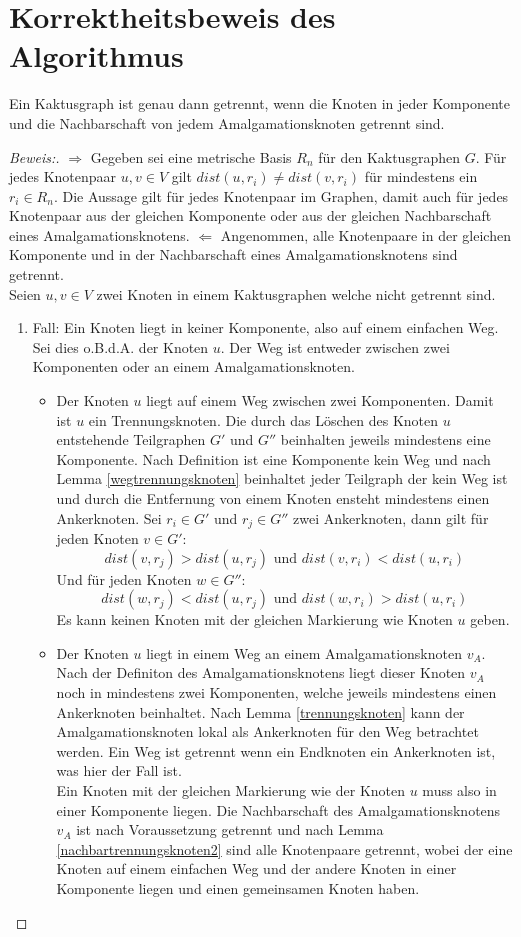 \section{Korrektheitsbeweis des Algorithmus}
\begin{lem}
Ein Kaktusgraph ist genau dann getrennt, wenn die Knoten in jeder Komponente und die Nachbarschaft von jedem Amalgamationsknoten getrennt sind.  
\end{lem}
\begin{proof}[Beweis:]
$\Longrightarrow$ Gegeben sei eine metrische Basis $R_n$ für den Kaktusgraphen $G$. Für jedes Knotenpaar $u,v \in V$ gilt $dist(u,r_i)\neq dist(v,r_i)$ für mindestens ein $r_i \in R_n$. Die Aussage gilt für jedes Knotenpaar im Graphen, damit auch für jedes Knotenpaar aus der gleichen Komponente oder aus der gleichen Nachbarschaft eines Amalgamationsknotens.\newline
$\Longleftarrow$ Angenommen, alle Knotenpaare in der gleichen Komponente und in der Nachbarschaft eines Amalgamationsknotens sind getrennt.\\
Seien $u,v \in V$ zwei Knoten in einem Kaktusgraphen welche nicht getrennt sind.
\begin{enumerate}
\item Fall: Ein Knoten liegt in keiner Komponente, also auf einem einfachen Weg. Sei dies o.B.d.A. der Knoten $u$. Der Weg ist entweder zwischen zwei Komponenten oder an einem Amalgamationsknoten.
\begin{itemize}
\item Der Knoten $u$ liegt auf einem Weg zwischen zwei Komponenten. Damit ist $u$ ein Trennungsknoten. Die durch das Löschen des Knoten $u$ entstehende Teilgraphen $G'$ und $G''$ beinhalten jeweils mindestens eine Komponente. Nach Definition ist eine Komponente kein Weg und nach Lemma \ref{wegtrennungsknoten} beinhaltet jeder Teilgraph der kein Weg ist und durch die Entfernung von einem Knoten ensteht mindestens einen Ankerknoten. Sei $r_i \in G'$ und $r_j \in G''$ zwei Ankerknoten, dann gilt für jeden Knoten $v \in G'$:
$$ dist(v,r_j)>dist(u,r_j)\text{ und } dist(v,r_i)<dist(u,r_i)$$
Und für jeden Knoten $w \in G'' $:
$$ dist(w,r_j)<dist(u,r_j)\text{ und } dist(w,r_i)>dist(u,r_i)$$
Es kann keinen Knoten mit der gleichen Markierung wie Knoten $u$ geben.
\item Der Knoten $u$ liegt in einem Weg an einem Amalgamationsknoten $v_A$. Nach der Definiton des Amalgamationsknotens liegt dieser Knoten $v_A$ noch in mindestens zwei Komponenten, welche jeweils mindestens einen Ankerknoten beinhaltet. Nach Lemma \ref{trennungsknoten} kann der Amalgamationsknoten lokal als Ankerknoten für den Weg betrachtet werden. Ein Weg ist getrennt wenn ein Endknoten ein Ankerknoten ist, was hier der Fall ist.\\Ein Knoten mit der gleichen Markierung wie der Knoten $u$ muss also in einer Komponente liegen. Die Nachbarschaft des Amalgamationsknotens $v_A$ ist nach Voraussetzung getrennt und nach Lemma \ref{nachbartrennungsknoten2} sind alle Knotenpaare getrennt, wobei der eine Knoten auf einem einfachen Weg und der andere Knoten in einer Komponente liegen und einen gemeinsamen Knoten haben.  

\end{itemize}
\end{enumerate}
\end{proof}
